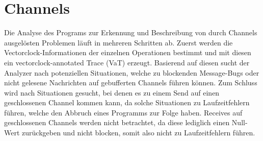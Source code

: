 \section{Channels}\label{Chap:Analyse-Sec:Channel}
Die Analyse des Programs zur Erkennung und Beschreibung von durch Channels ausgelösten 
Problemen läuft in mehreren Schritten ab. Zuerst werden die Vectorclock-Informationen 
der einzelnen Operationen bestimmt und mit diesen ein vectorclock-annotated Trace 
(VaT) erzeugt. Basierend auf diesen sucht der Analyzer nach potenziellen 
Situationen, welche zu blockenden Message-Bugs oder nicht gelesene
Nachrichten auf gebufferten Channels führen können. Zum Schluss 
wird nach Situationen gesucht, bei denen es zu einem Send auf einen 
geschlossenen Channel kommen kann, da solche Situationen zu Laufzeitfehlern 
führen, welche den Abbruch eines Programms zur Folge haben.
Receives auf geschlossenen Channels werden nicht betrachtet, da diese 
lediglich einen Null-Wert zurückgeben und nicht blocken, somit also nicht 
zu Laufzeitfehlern führen. 

